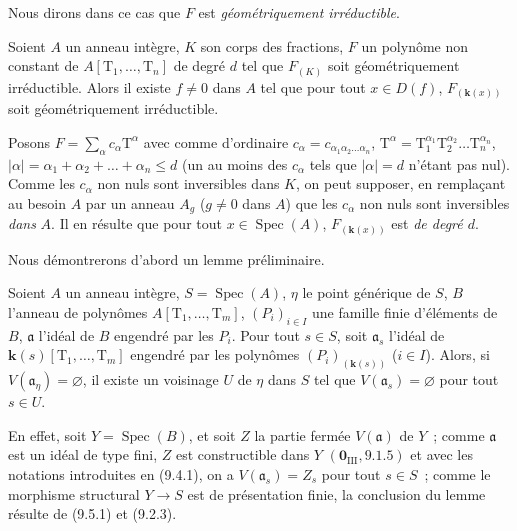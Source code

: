 Nous dirons dans ce cas que $F$ est \emph{géométriquement irréductible}.

\begin{lemma}[9.7.5]
\label{IV.9.7.5-fr}
Soient $A$ un anneau intègre, $K$ son corps des fractions, $F$ un polynôme non
constant de $A[\mathrm T_1,\ldots,\mathrm T_n]$ de degré $d$ tel que $F_{(K)}$
soit géométriquement irréductible. Alors il existe $f\neq0$ dans $A$ tel que
pour tout $x\in D(f)$, $F_{(\mathbf{k}(x))}$ soit géométriquement
irréductible.
\end{lemma}

Posons $F=\sum_\alpha c_\alpha\mathrm T^\alpha$ avec comme d'ordinaire
$c_\alpha=c_{\alpha_1\alpha_2\ldots\alpha_n}$,
$\mathrm T^\alpha=\mathrm T_1^{\alpha_1}\mathrm T_2^{\alpha_2}\ldots
\mathrm T_n^{\alpha_n}$,
$|\alpha|=\alpha_1+\alpha_2+\ldots+\alpha_n\leqslant d$ (un au moins des
$c_\alpha$ tels que $|\alpha|=d$ n'étant pas nul). Comme les $c_\alpha$ non
nuls sont inversibles dans $K$, on peut supposer, en remplaçant au besoin $A$
par un anneau $A_g$ ($g\neq0$ dans $A$) que les $c_\alpha$ non nuls sont
inversibles \emph{dans} $A$. Il en résulte que pour tout $x\in\operatorname{Spec}(A)$,
$F_{(\mathbf{k}(x))}$ est \emph{de degré $d$}.

Nous démontrerons d'abord un lemme préliminaire.

\begin{lemma}[9.7.5.1]
\label{IV.9.7.5.1-fr}
Soient $A$ un anneau intègre, $S=\operatorname{Spec}(A)$, $\eta$ le point
générique de $S$, $B$ l'anneau de polynômes
$A[\mathrm T_1,\ldots,\mathrm T_m]$, $(P_i)_{i\in I}$ une famille finie
d'éléments de $B$, $\mathfrak a$ l'idéal de $B$ engendré par les $P_i$. Pour
tout $s\in S$, soit $\mathfrak a_s$ l'idéal de
$\boldsymbol{k}(s)[\mathrm T_1,\ldots,\mathrm T_m]$ engendré par les polynômes
$(P_i)_{(\mathbf{k}(s))}$ ($i\in I$). Alors, si
$V(\mathfrak a_\eta)=\varnothing$, il existe un voisinage $U$ de $\eta$ dans
$S$ tel que $V(\mathfrak a_s)=\varnothing$ pour tout $s\in U$.
\end{lemma}

En effet, soit $Y=\operatorname{Spec}(B)$, et soit $Z$ la partie fermée
$V(\mathfrak a)$ de $Y$~; comme $\mathfrak a$ est un idéal de type fini, $Z$
est constructible dans $Y$ $(\mathbf 0_{\mathrm{III}},9.1.5)$ et avec les
notations introduites en (9.4.1), on a $V(\mathfrak a_s)=Z_s$ pour tout
$s\in S$~; comme le morphisme structural $Y\to S$ est de présentation finie,
la conclusion du lemme résulte de (9.5.1) et (9.2.3).

